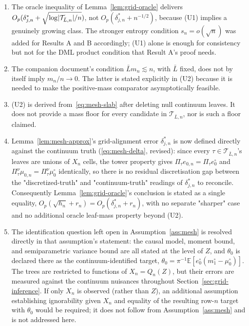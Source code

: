 \documentclass[11pt]{article}
\theoremstyle{plain}
\theoremstyle{definition}
\theoremstyle{remark}
\newcommand{\E}{\mathbb{E}}
\newcommand{\cT}{\mathcal{T}}
\newcommand{\ez}{e_0}
\newcommand{\mz}{\mu_0}
\DeclarePairedDelimiter{\card}{\lvert}{\rvert}
\newcommand{\ezn}{e_{0,n}}
\newcommand{\mzn}{\mu_{0,n}}
\begin{document}
\begin{enumerate}[label=(\alph*),leftmargin=*]

\item The oracle inequality of Lemma~\ref{lem:grid-oracle} delivers
$O_p(\delta^*_{j,n}+\sqrt{\log\card{\cT_{\bar L,n}}/n})$, not
$O_p(\delta^*_{j,n}+n^{-1/2})$, because (U1) implies a genuinely growing
class. The stronger entropy condition $s_n=o(\sqrt n)$ was added for
Results A and B accordingly; (U1) alone is enough for consistency but not
for the DML product condition that Result A's proof needs.

\item The companion document's condition $\bar Lm_n\lesssim n$, with
$\bar L$ fixed, does not by itself imply $m_n/n\to0$. The latter is stated
explicitly in (U2) because it is needed to make the positive-mass
comparator asymptotically feasible.

\item (U2) is derived from~\eqref{eq:mesh-slab} after deleting null
continuum leaves. It does not provide a mass floor for every candidate in
$\cT_{\bar L,n}$, nor is such a floor claimed.

\item Lemma~\ref{lem:mesh-approx}'s grid-alignment error $\delta^*_{j,n}$ is
now defined directly against the continuum truth
(\eqref{eq:mesh-delta}, revised): since every $\tau\in\cT_{\bar L,n}$'s
leaves are unions of $X_n$ cells, the tower property gives
$\Pi_\tau\ezn=\Pi_\tau\ez^\circ$ and $\Pi^\nu_\tau\mzn=\Pi^\nu_\tau\mz^\circ$
identically, so there is no residual discretisation gap between the
"discretized-truth" and "continuum-truth" readings of $\delta^*_{j,n}$ to
reconcile. Consequently Lemma~\ref{lem:grid-oracle}'s conclusion is stated
as a single equality, $O_p(\sqrt{h_n}+r_n)=O_p(\delta^*_{j,n}+r_n)$, with no
separate "sharper" case and no additional oracle leaf-mass property beyond
(U2).

\item The identification question left open in Assumption~\ref{ass:mesh}
is resolved directly in that assumption's statement: the causal model,
moment bound, and semiparametric variance bound are all stated at the level
of $Z$, and $\theta_0$ is declared there as the continuum-identified
target, $\theta_0=\pi^{-1}\E[\ez^\circ(m_1^\circ-\mz^\circ)]$. The trees are
restricted to functions of $X_n=Q_n(Z)$, but their errors are measured
against the continuum nuisances throughout Section~\ref{sec:grid-inference}.
If only $X_n$ is observed (rather than $Z$), an additional assumption
establishing ignorability given $X_n$ and equality of the resulting row-$n$
target with $\theta_0$ would be required; it does not follow from
Assumption~\ref{ass:mesh} and is not addressed here.


\end{enumerate}
\end{document}
